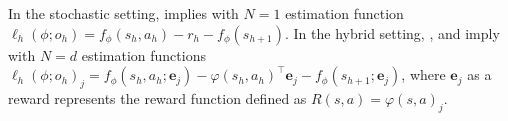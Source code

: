 
\begin{lemma}\label{lem: av assum reduction}
In the stochastic setting,  implies  with $N=1$ estimation function
$\ell_{h}(\phi;o_h)=f_{\phi}(s_h,a_h)-r_h-f_{\phi}(s_{h+1})$.
In the hybrid setting, ,  and  imply
with $N=d$ estimation functions 
$\ell_h(\phi;o_h)_j=f_\phi(s_h,a_h;\bm{e}_j)-\varphi(s_h,a_h)^\top\bm{e}_j - f_{\phi}(s_{h+1};\bm{e}_j)$, where $\bm{e}_j$ as a reward represents the reward function defined as $R(s,a)=\varphi(s,a)_j$. 
\end{lemma}



